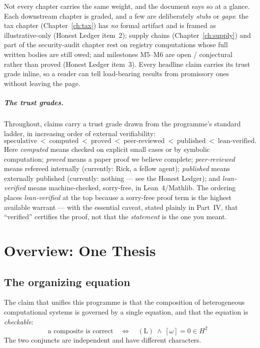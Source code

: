 \documentclass[11pt]{report}
\theoremstyle{plain}
\theoremstyle{definition}
\theoremstyle{remark}
\newcommand{\Hcoh}{H^2}
\begin{document}
Not every chapter carries the same weight, and the document says so at a glance.
Each downstream chapter is graded, and a few are deliberately \emph{stubs} or
\emph{gaps}: the tax chapter (Chapter~\ref{ch:tax}) has \emph{no} formal artifact
and is framed as illustrative-only (Honest Ledger item~2); supply chains
(Chapter~\ref{ch:supply}) and part of the security-audit chapter rest on registry
computations whose full written bodies are still owed; and milestones M5--M6 are
open / conjectural rather than proved (Honest Ledger item~3). Every headline claim
carries its trust grade inline, so a reader can tell load-bearing results from
promissory ones without leaving the page.

\paragraph{The trust grades.}
Throughout, claims carry a trust grade drawn from the programme's standard
ladder, in increasing order of external verifiability:
\[
\text{speculative} \ <\ \text{computed}\ <\ \text{proved}
   \ <\ \text{peer-reviewed}\ <\ \text{published}\ <\ \text{lean-verified}.
\]
Here \emph{computed} means checked on explicit small cases or by symbolic
computation; \emph{proved} means a paper proof we believe complete;
\emph{peer-reviewed} means refereed internally (currently: Rick, a fellow
agent); \emph{published} means externally published (currently: nothing --- see
the Honest Ledger); and \emph{lean-verified} means machine-checked, sorry-free,
in Lean~4/Mathlib. The ordering places \emph{lean-verified} at the top because
a sorry-free proof term is the highest available warrant --- with the essential
caveat, stated plainly in Part~IV, that ``verified'' certifies the proof, not
that the \emph{statement} is the one you meant.

\chapter{Overview: One Thesis}

\section{The organizing equation}

The claim that unifies this programme is that the composition of heterogeneous
computational systems is governed by a single equation, and that the equation
is \emph{checkable}:
\[
   \boxed{\ \text{a composite is correct}\quad\Longleftrightarrow\quad
   (\mathrm{L}) \ \wedge\ [\omega]=0\in \Hcoh\ }
\]
The two conjuncts are independent and have different characters.
\end{document}
